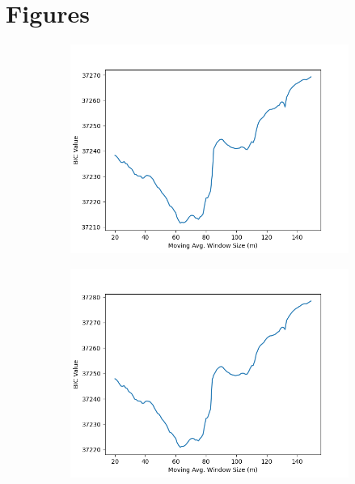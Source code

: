 \documentclass[12pt]{article}
\begin{document}
\newpage
\section*{Figures}
\graphicspath{{BICPlots/}}
\begin{figure}[!ht]
  \centering
  \scriptsize
  \setlength{\abovecaptionskip}{1pt}
  \setlength{\belowcaptionskip}{1pt}
  \captionsetup{font=scriptsize}
  
  \caption[BIC Plots]{%
BIC Plots. This figure shows the Bayesian Information Criterion (BIC) against moving‑average window size \(m\) for all MF2‑GARCH‑in‑mean specifications. The optimal \(m\) minimizes BIC. Left column: proportional variants, right column: non‑proportional. From top to bottom: short‑term component, long‑term component, two-component, and overall conditional variance specifications.}
\begin{subfigure}[!ht]{0.45\textwidth}
\includegraphics[width=\linewidth]{Prop_ST_Cr}
\end{subfigure}\hfill
\begin{subfigure}[!ht]{0.45\textwidth}
    \includegraphics[width=\linewidth]{ST_Cr}
  \end{subfigure}


\end{figure}
\end{document}
